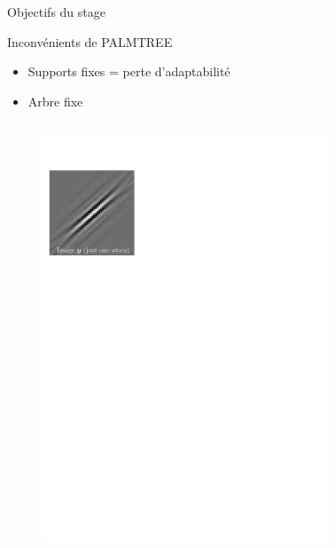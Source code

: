 \begin{frame}{Objectifs du stage}
\begin{alertblock}{Inconvénients de PALMTREE}
\begin{itemize}
\item Supports fixes = perte d'adaptabilité
\item Arbre fixe
\end{itemize}
\end{alertblock}
\begin{columns} \centering
\begin{column}{0.20\textwidth} \begin{figure}\centering
	\includegraphics[width=0.9\textwidth]{figures/manual-better-support/target.pdf}
\end{figure}\end{column}
\begin{column}{0.20\textwidth} \begin{figure}\centering

\end{figure}
\end{column}
\end{columns}
\end{frame}
